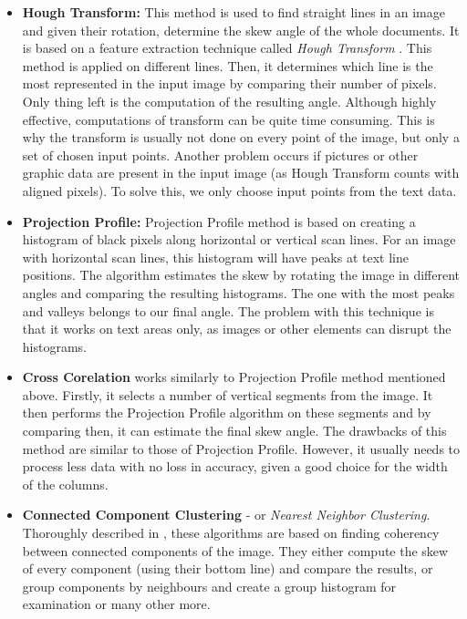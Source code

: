 \begin{itemize}

\item\textbf{Hough Transform:} This method is used to find straight lines in an image and given their rotation, determine the skew angle of the whole documents. It is based on a feature extraction technique called \emph{Hough Transform} \citep{houghTransform}. This method is applied on different lines. Then, it determines which line is the most represented in the input image by comparing their number of pixels. Only thing left is the computation of the resulting angle. Although highly effective, computations of transform can be quite time consuming. This is why the transform is usually not done on every point of the image, but only a set of chosen input points. Another problem occurs if pictures or other graphic data are present in the input image (as Hough Transform counts with aligned pixels). To solve this, we only choose input points from the text data.

\item\textbf{Projection Profile: } Projection Profile method is based on creating a histogram of black pixels along horizontal or vertical scan lines. For an image with horizontal scan lines, this histogram will have peaks at text line positions. The algorithm estimates the skew by rotating the image in different angles and comparing the resulting histograms. The one with the most peaks and valleys belongs to our final angle. The problem with this technique is that it works on text areas only, as images or other elements can disrupt the histograms.

\item\textbf{Cross Corelation} works similarly to Projection Profile method mentioned above. Firstly, it selects a number of vertical segments from the image. It then performs the Projection Profile algorithm on these segments and by comparing then, it can estimate the final skew angle. The drawbacks of this method are similar to those of Projection Profile. However, it usually needs to process less data with no loss in accuracy, given a good choice for the width of the columns.

\item\textbf{Connected Component Clustering} - or \emph{Nearest Neighbor Clustering}. Thoroughly described in \citet{skewClustering}, these algorithms are based on finding coherency between connected components of the image. They either compute the skew of every component (using their bottom line) and compare the results, or group components by neighbours and create a group histogram for examination or many other more.

\end{itemize}

